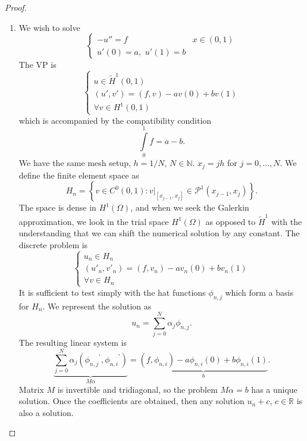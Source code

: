 \documentclass[letterpaper,twoside,11pt]{article}
\theoremstyle{mystyle}
\newcommand{\R}{{\mathbb R}}
\newcommand{\N}{{\mathbb N}}
\newcommand{\cblu}{\color{blue}}
\newcommand{\Hone}{H^1\left( \Omega \right)}
\begin{document}
\cblu
\begin{proof}
  \begin{enumerate}
    \item We wish to solve 
    \[\left\{ {\begin{array}{*{20}{l}}
      { - u'' = f}&{x \in \left( {0,1} \right)} \\[.2cm] 
      {u'\left( 0 \right) = a,\,\,u'\left( 1 \right) = b}&{} 
    \end{array}} \right.\]
    The VP is 
    \[\left\{ {\begin{array}{*{20}{l}}
      {u \in {{\tilde H}^1}\left( {0,1} \right)} \\[.2cm] 
      {\left( {u',v'} \right) = \left( {f,v} \right) - av\left( 0 \right) + bv\left( 1 \right)} \\[.2cm] 
      {\forall v \in {H^1}\left( {0,1} \right)} 
    \end{array}} \right.\]
    which is accompanied by the compatibility condition 
    \[\int\limits_0^1 f = a-b.\]
    We have the same mesh setup, $h = 1/N$, $N \in \N$. $x_j = jh$ for $j = 0, \dots, N$. We define the finite element space as 
    \[{H_n} = \left\{ {v \in {C^0}\left( {0,1} \right):{{\left. v \right|}_{\left[ {{x_{j - 1}},{x_j}} \right]}} \in {\mathcal{P}^1}\left( {{x_{j - 1}},{x_j}} \right)} \right\}.\]
    The space is dense in $\Hone$, and when we seek the Galerkin approximation, we look in the trial space $\Hone$ as opposed to $\tilde H^1$ with the understanding that we can shift the numerical solution by any constant. The discrete problem is 
    \[\left\{ {\begin{array}{*{20}{l}}
      {{u_n} \in {H_n}} \\[.2cm]
      {\left( {{{u'}_n},{{v'}_n}} \right) = \left( {f,{v_n}} \right) - a{v_n}\left( 0 \right) + b{v_n}\left( 1 \right)} \\[.2cm]
      {\forall v \in {H_n}} 
    \end{array}} \right.\]
    It is sufficient to test simply with the hat functions $\phi_{n,j}$ which form a basis for $H_n$. We represent the solution as 
    \[u_n = \sum_{j=0}^{N}\alpha_j \phi_{n,j}.\]
    The resulting linear system is 
    \[\underbrace {\sum\limits_{j = 0}^N {{\alpha _j}\left( {{\phi _{n,j}}^\prime ,{\phi _{n,i}}^\prime } \right)} }_{M\alpha } = \underbrace {\left( {f,{\phi _{n,i}}} \right) - a{\phi _{n,i}}\left( 0 \right) + b{\phi _{n,i}}\left( 1 \right)}_b.\]
    Matrix $M$ is invertible and tridiagonal, so the problem $M\alpha = b$ has a unique solution. Once the coefficients are obtained, then any solution $u_n + c$, $c \in \R$ is also a solution. 

\end{enumerate}
\end{proof}
\end{document}
